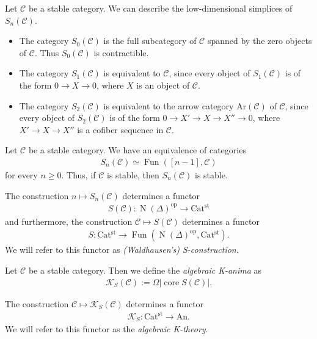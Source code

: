 \documentclass[a4paper,dvipdfmx,11pt,reqno]{amsart}
\DeclareMathOperator{\myop}{op}
\DeclareMathOperator{\N}{N}
\DeclareMathOperator{\Fun}{Fun}
\DeclareMathOperator{\core}{core}
\newcommand{\C}{\mathcal{C}}
\newcommand{\K}{\mathcal{K}}
\newcommand{\An}{\mathrm{An}}
\newcommand{\Catst}{\mathrm{Cat^{st}}}
\newcommand{\Ar}{\mathrm{Ar}}
\begin{document}
\begin{remark}
  Let $\C$ be a stable category.
  We can describe the low-dimensional simplices of $S_n(\C)$.
  \begin{itemize}
    \item The category $S_0(\C)$ is the full subcategory of $\C$ spanned by the zero objects of $\C$. 
    Thus $S_0(\C)$ is contractible.
    \item The category $S_1(\C)$ is equivalent to $\C$, since every object of $S_1(\C)$ is of the form $0 \to X \to 0$, where $X$ is an object of $\C$.
    \item The category $S_2(\C)$ is equivalent to the arrow category $\Ar(\C)$ of $\C$, since every object of $S_2(\C)$ is of the form $0 \to X' \to X \to X'' \to 0$, where $X' \to X \to X''$ is a cofiber sequence in $\C$. 
  \end{itemize}
\end{remark}

\begin{remark}
  Let $\C$ be a stable category.
  We have an equivalence of categories 
  \begin{align*}
    S_n(\C) \simeq \Fun([n-1],\C)
  \end{align*}
  for every $n \geq 0$.
  Thus, if $\C$ is stable, then $S_n(\C)$ is stable.
\end{remark}

\begin{definition}
  The construction $n \mapsto S_n(\C)$ determines a functor 
  \begin{align*}
    S(\C) : \N(\Delta)^{\myop} \to \Catst
  \end{align*}
  and furthermore, the construction $\C \mapsto S(\C)$ determines a functor 
  \begin{align*}
    S : \Catst \to \Fun(\N(\Delta)^{\myop},\Catst).
  \end{align*}
  We will refer to this functor as \textit{(Waldhausen's) S-construction}.
\end{definition}

\begin{definition} \label{def.algebraic_k-anima_using_S}
  Let $\C$ be a stable category.
  Then we define the \textit{algebraic K-anima} as 
  \begin{align*}
    \K_S(\C) := \Omega|\core S(\C)|.
  \end{align*}

  The construction $\C \mapsto \K_S(\C)$ determines a functor 
  \begin{align*}
    \K_S : \Catst \to \An.
  \end{align*}
  We will refer to this functor as the \textit{algebraic K-theory}.
\end{definition}
 
\end{document}

